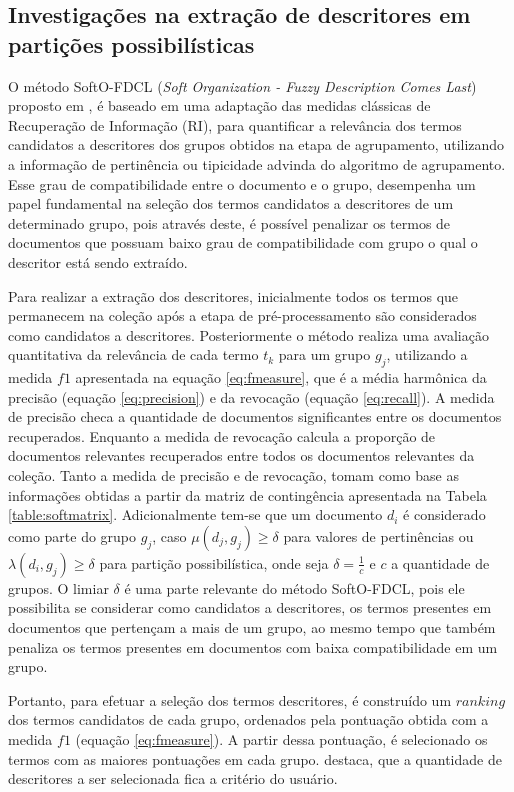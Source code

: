 \subsection{Investigações na extração de descritores em partições possibilísticas}

O método SoftO-FDCL ({\it Soft Organization - Fuzzy Description Comes Last}) proposto em 
, é baseado em uma adaptação das medidas clássicas de Recuperação de
Informação (RI), para quantificar a relevância dos termos candidatos a descritores dos grupos
obtidos na etapa de agrupamento, utilizando a informação de pertinência ou tipicidade advinda do
algoritmo de agrupamento.  Esse grau de compatibilidade entre o documento e o grupo, desempenha um
papel fundamental na seleção dos termos candidatos a descritores de um determinado grupo, pois
através deste, é possível penalizar os termos de documentos que possuam baixo grau de
compatibilidade com grupo o qual o descritor está sendo extraído.  

Para realizar a extração dos descritores, inicialmente todos os termos que permanecem na coleção
após a etapa de pré-processamento são considerados como candidatos a descritores. Posteriormente o
método realiza uma avaliação quantitativa da relevância de cada termo $t_k$ para um grupo $g_j$,
utilizando a medida $f1$ apresentada na equação \ref{eq:fmeasure}, que é a média harmônica da
precisão (equação \ref{eq:precision}) e da revocação (equação \ref{eq:recall}).
A medida de precisão checa a quantidade de documentos significantes entre os documentos
recuperados. Enquanto a medida de revocação calcula a proporção de documentos relevantes recuperados
entre todos os documentos relevantes da coleção. Tanto a medida de precisão e de revocação, tomam
como base as informações obtidas a partir da matriz de contingência apresentada na Tabela
\ref{table:softmatrix}. Adicionalmente tem-se que um documento $d_i$ é considerado como parte do
grupo $g_j$, caso $\mu(d_j,g_j) \geq \delta$ para valores de pertinências ou $\lambda(d_i,g_j) \geq
\delta$ para partição possibilística, onde seja $\delta = \frac{1}{c}$ e $c$ a quantidade de
grupos. O limiar $\delta$ é uma parte relevante do método SoftO-FDCL, pois ele possibilita se
considerar como candidatos a descritores, os termos presentes em documentos que pertençam a mais de
um grupo, ao mesmo tempo que também penaliza os termos presentes em documentos com baixa
compatibilidade em um grupo.

Portanto, para efetuar a seleção dos termos descritores, é construído um $ranking$ dos termos
candidatos de cada grupo, ordenados pela pontuação obtida com a medida $f1$ (equação
\ref{eq:fmeasure}). A partir dessa pontuação, é selecionado os termos com as maiores
pontuações em cada grupo.  destaca, que a quantidade de descritores a ser
selecionada fica a critério do usuário.

